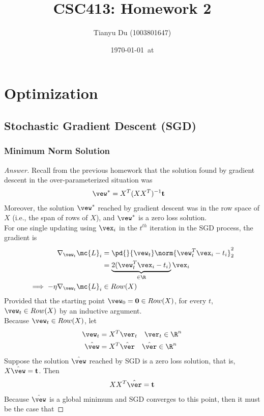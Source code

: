 \documentclass{article}
\title{CSC413: Homework 2}
\date{\today\ at \currenttime}
\author{Tianyu Du (1003801647)}
\begin{document}
	\maketitle
	\section{Optimization}
	\subsection{Stochastic Gradient Descent (SGD)}
	\subsubsection{Minimum Norm Solution}
	\begin{proof}[Answer]
		Recall from the previous homework that the solution found by gradient descent in the over-parameterized situation was
		\begin{align}
			\vew^* &= X^T (XX^T)^{-1} \textbf{t}
		\end{align}
		Moreover, the solution $\vew^*$ reached by gradient descent was in the row space of $X$ (i.e., the span of rows of $X$), and $\vew^*$ is a zero loss solution. \\
		For one single updating using $\vex_i$ in the $t^{th}$ iteration in the SGD process, the gradient is
		\begin{align}
			\nabla_{\vew_t}{\mc{L}_i} &= \pd{}{\vew_t} \norm{\vew_t^T \vex_i - t_i}_2^2 \\
			&= \underbrace{2 (\vew_t^T \vex_i - t_i)}_{\in \R} \vex_i \\
			\implies - \eta \nabla_{\vew_t}{\mc{L}_i} &\in Row(X)
		\end{align}
		Provided that the starting point $\vew_0 = \textbf{0} \in Row(X)$, for every $t$, $\vew_t \in Row(X)$ by an inductive argument. \\
		Because $\vew_t \in Row(X)$, let 
		\begin{align}
			\vew_t &= X^T \ver_t\quad \ver_t \in \R^n \\
			\hat{\vew} &= X^T \hat{\ver}\quad \hat{\ver} \in \R^n
		\end{align}
		Suppose the solution $\hat{\vew}$ reached by SGD is a zero loss solution, that is, $X \hat{\vew} = \textbf{t}$. Then 
		\begin{align}
			XX^T \hat{\ver} = \textbf{t}
		\end{align}
		Because $\hat{\vew}$ is a global minimum and SGD converges to this point, then it must be the case that

\end{proof}
\end{document}
